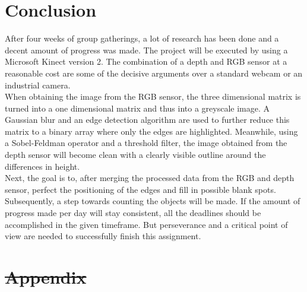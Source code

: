 \documentclass{article}
\providecommand{\DIFdeltex}[1]{{\protect\color{red}\sout{#1}}}                      %
\providecommand{\DIFaddbegin}{} %
\providecommand{\DIFaddend}{} %
\providecommand{\DIFdelbegin}{} %
\providecommand{\DIFdelend}{} %
\providecommand{\DIFdel}[1]{\texorpdfstring{\DIFdeltex{#1}}{}} %
\newcommand{\DIFscaledelfig}{0.5}
\newlength{\DIFdelgraphicswidth} %
\newlength{\DIFdelgraphicsheight} %
\newcommand{\DIFaddincludegraphics}[2][]{{\color{blue}\fbox{\DIFOincludegraphics[#1]{#2}}}} %
\newcommand{\DIFdelincludegraphics}[2][]{%
\sbox{\DIFdelgraphicsbox}{\DIFOincludegraphics[#1]{#2}}%
\settoboxwidth{\DIFdelgraphicswidth}{\DIFdelgraphicsbox} %
\settoboxtotalheight{\DIFdelgraphicsheight}{\DIFdelgraphicsbox} %
\scalebox{\DIFscaledelfig}{%
\parbox[b]{\DIFdelgraphicswidth}{\usebox{\DIFdelgraphicsbox}\\[-\baselineskip] \rule{\DIFdelgraphicswidth}{0em}}\llap{\resizebox{\DIFdelgraphicswidth}{\DIFdelgraphicsheight}{%
\setlength{\unitlength}{\DIFdelgraphicswidth}%
\begin{picture}(1,1)%
\thicklines\linethickness{2pt} %
{\color[rgb]{1,0,0}\put(0,0){\framebox(1,1){}}}%
{\color[rgb]{1,0,0}\put(0,0){\line( 1,1){1}}}%
{\color[rgb]{1,0,0}\put(0,1){\line(1,-1){1}}}%
\end{picture}%
}\hspace*{3pt}}} %
} %
\DeclareRobustCommand{\DIFaddbegin}{\DIFOaddbegin \let\includegraphics\DIFaddincludegraphics} %
\DeclareRobustCommand{\DIFaddend}{\DIFOaddend \let\includegraphics\DIFOincludegraphics} %
\DeclareRobustCommand{\DIFdelbegin}{\DIFOdelbegin \let\includegraphics\DIFdelincludegraphics} %
\DeclareRobustCommand{\DIFdelend}{\DIFOaddend \let\includegraphics\DIFOincludegraphics} %
\begin{document}
\section{Conclusion}
After four weeks of group gatherings, a lot of research has been done and a decent amount of progress was made. The project will be executed by using a Microsoft Kinect version 2. The combination of a depth and RGB sensor at a reasonable cost are some of the decisive arguments over a standard webcam or an industrial camera. \\
When obtaining the image from the RGB sensor, the three dimensional matrix is turned into a one dimensional matrix and thus into a greyscale image. A Gaussian blur and an edge detection algorithm are used to further reduce this matrix to a binary array where only the edges are highlighted. Meanwhile, using a Sobel-Feldman operator and a threshold filter, the image obtained from the depth sensor will become clean with a clearly visible outline around the differences in height. \\
Next, the goal is to, after merging the processed data from the RGB and depth sensor, perfect the positioning of the edges and fill in possible blank spots. Subsequently, a step towards counting the objects will be made. If the amount of progress made per day will stay consistent, all the deadlines should be  accomplished in the given timeframe. But perseverance and a critical point of view are needed to successfully finish this assignment. 

\newpage

\nocite{*}


\newpage
\DIFdelbegin \section{\DIFdel{Appendix}}
\addtocounter{section}{-1}%
\DIFdelend 

\DIFaddbegin 

\DIFaddend %

\end{document}
